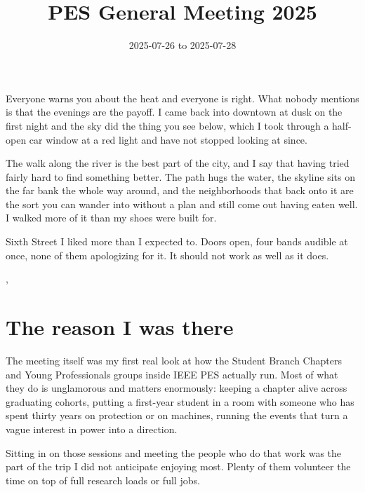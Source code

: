 
\title{PES General Meeting 2025}
\date{2025-07-26 to 2025-07-28}




Everyone warns you about the heat and everyone is right. What nobody mentions is
that the evenings are the payoff. I came back into downtown at dusk on the
first night and the sky did the thing you see below, which I took through a
half-open car window at a red light and have not stopped looking at since.


The walk along the river is the best part of the city, and I say that having
tried fairly hard to find something better. The path hugs the water, the
skyline sits on the far bank the whole way around, and the neighborhoods that
back onto it are the sort you can wander into without a plan and still come out
having eaten well. I walked more of it than my shoes were built for.

Sixth Street I liked more than I expected to. Doors open, four bands audible at
once, none of them apologizing for it. It should not work as well as it does.

\sep

\section{The reason I was there}

The meeting itself was my first real look at how the Student Branch Chapters
and Young Professionals groups inside IEEE PES actually run. Most of what they
do is unglamorous and matters enormously: keeping a chapter alive across
graduating cohorts, putting a first-year student in a room with someone who has
spent thirty years on protection or on machines, running the events that turn a
vague interest in power into a direction.

Sitting in on those sessions and meeting the people who do that work was the
part of the trip I did not anticipate enjoying most. Plenty of them volunteer
the time on top of full research loads or full jobs.


